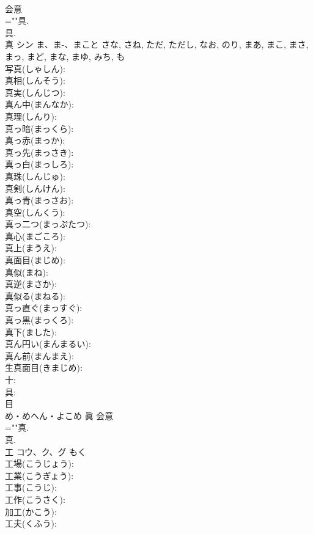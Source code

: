 \documentclass[8pt]{extreport}
\begin{document}
\begin{CJK}{UTF8}{min}
\\	会意 
\\	=""具.
\\	具.
\\	真	シン	ま、ま-、まこと	さな, さね, ただ, ただし, なお, のり, まあ, まこ, まさ, まっ, まど, まな, まゆ, みち, も	
\\	写真(しゃしん): 
\\	真相(しんそう): 
\\	真実(しんじつ): 
\\	真ん中(まんなか): 
\\	真理(しんり): 
\\	真っ暗(まっくら): 
\\	真っ赤(まっか): 
\\	真っ先(まっさき): 
\\	真っ白(まっしろ): 
\\	真珠(しんじゅ): 
\\	真剣(しんけん): 
\\	真っ青(まっさお): 
\\	真空(しんくう): 
\\	真っ二つ(まっぷたつ): 
\\	真心(まごころ): 
\\	真上(まうえ): 
\\	真面目(まじめ): 
\\	真似(まね): 
\\	真逆(まさか): 
\\	真似る(まねる): 
\\	真っ直ぐ(まっすぐ): 
\\	真っ黒(まっくろ): 
\\	真下(ました): 
\\	真ん円い(まんまるい): 
\\	真ん前(まんまえ): 
\\	生真面目(きまじめ): 
\\	十: 
\\	具: 
\\	目	
\\	め・めへん・よこめ	眞	会意 
\\	=""真.
\\	真.
\\	工	コウ、ク、グ		もく	
\\	工場(こうじょう): 
\\	工業(こうぎょう): 
\\	工事(こうじ): 
\\	工作(こうさく): 
\\	加工(かこう): 
\\	工夫(くふう): 

\end{CJK}
\end{document}
